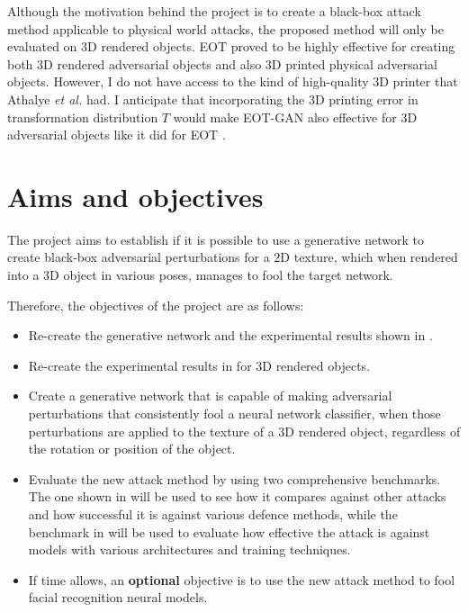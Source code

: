 Although the motivation behind the project is to create a black-box attack method applicable to physical world attacks, the proposed method will only be evaluated on 3D rendered objects. EOT proved to be highly effective for creating both 3D rendered adversarial objects and also 3D printed physical adversarial objects. However, I do not have access to the kind of high-quality 3D printer that Athalye \textit{et al.} \cite{athalye} had. I anticipate that incorporating the 3D printing error in transformation distribution $T$ would make EOT-GAN also effective for 3D adversarial objects like it did for EOT \cite{athalye}.

\section{Aims and objectives}
    \label{sec:aims_objectives}

The project aims to establish if it is possible to use a generative network to create black-box adversarial perturbations for a 2D texture, which when rendered into a 3D object in various poses, manages to fool the target network. 

Therefore, the objectives of the project are as follows:

\begin{itemize}
    \item Re-create the generative network and the experimental results shown in \cite{zheng_black_box_GAN}.
    \item Re-create the experimental results in \cite{athalye} for 3D rendered objects.
    \item Create a generative network that is capable of making adversarial perturbations that consistently fool a neural network classifier, when those perturbations are applied to the texture of a 3D rendered object, regardless of the rotation or position of the object.
    \item Evaluate the new attack method by using two comprehensive benchmarks. The one shown in \cite{dong2020benchmarking} will be used to see how it compares against other attacks and how successful it is against various defence methods, while the benchmark in \cite{robustart} will be used to evaluate how effective the attack is against models with various architectures and training techniques.
    \item If time allows, an \textbf{optional} objective is to use the new attack method to fool facial recognition neural models.
\end{itemize}
	
